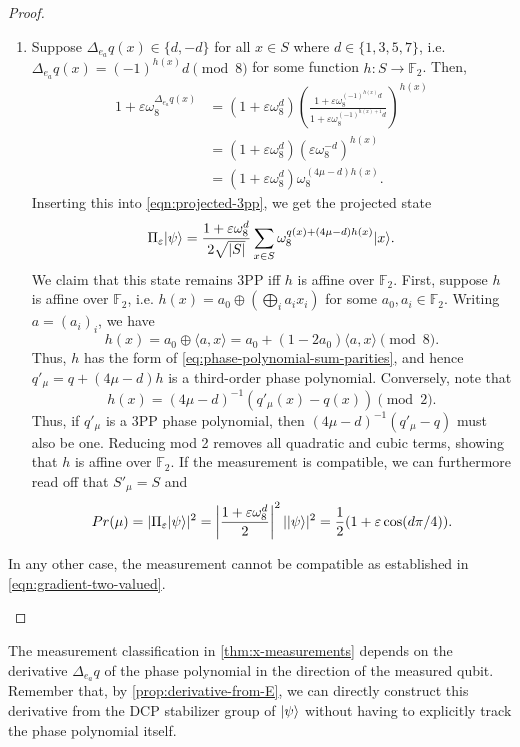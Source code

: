 \begin{proof}
\begin{enumerate}
\begin{enumerate}
\item
Suppose $\Delta_{e_a}q(x) \in \{ d, -d \}$ for all $x \in S$ where $d \in \{ 1, 3, 5, 7 \}$, i.e. $\Delta_{e_a}q(x) = (-1)^{h(x)}d \pmod 8$ for some function $h: S \to \mathbb F_2$.
Then,
\begin{align*}
    1 + \varepsilon\omega_8^{\Delta_{e_a}q(x)}
    &= (1 + \varepsilon\omega_8^d) \left(\frac{1 + \varepsilon\omega_8^{(-1)^{h(x)} d}}{1 + \varepsilon\omega_8^{(-1)^{h(x) + 1} d}}\right)^{h(x)} \\
    &= (1 + \varepsilon\omega_8^d) (\varepsilon\omega_8^{-d})^{h(x)} \\
    &= (1 + \varepsilon\omega_8^d) \omega_8^{(4\mu - d)h(x)}.
\end{align*}
Inserting this into \cref{eqn:projected-3pp}, we get the projected state
\[ \Pi_\varepsilon |\psi\rangle = \frac{1 + \varepsilon\omega_8^d}{2\sqrt{|S|}} \sum_{x \in S} \omega_8^{q(x) + (4\mu - d)h(x)} |x\rangle. \]
We claim that this state remains 3PP iff $h$ is affine over $\mathbb F_2$.
First, suppose $h$ is affine over $\mathbb F_2$, i.e. $h(x) = a_0 \oplus \left(\bigoplus_i a_i x_i\right)$ for some $a_0,a_i \in \mathbb F_2$. Writing $a=(a_i)_i$, we have
\[
    h(x) = a_0 \oplus \langle a,x\rangle
    = a_0 + (1-2a_0)\langle a,x\rangle \pmod 8.
\]
Thus, $h$ has the form of \cref{eq:phase-polynomial-sum-parities}, and hence $q'_\mu=q+(4\mu-d)h$ is a third-order phase polynomial.
Conversely, note that
\[ h(x) = (4\mu - d)^{-1}(q'_\mu(x) - q(x)) \pmod 2. \]
Thus, if $q'_\mu$ is a 3PP phase polynomial, then $(4\mu - d)^{-1}(q'_\mu - q)$ must also be one.
Reducing mod 2 removes all quadratic and cubic terms, showing that $h$ is affine over $\mathbb F_2$.
If the measurement is compatible, we can furthermore read off that $S'_\mu = S$ and
\[ Pr(\mu) = |\Pi_\varepsilon|\psi\rangle|^2 = \left|\frac{1 + \varepsilon\omega_8^d}{2}\right|^2 ||\psi\rangle|^2 = \frac{1}{2}(1 + \varepsilon\cos(d\pi/4)). \]

\end{enumerate}

In any other case, the measurement cannot be compatible as established in \cref{eqn:gradient-two-valued}. \qedhere

\end{enumerate}
\end{proof}

The measurement classification in \cref{thm:x-measurements} depends on the derivative $\Delta_{e_a}q$ of the phase polynomial in the direction of the measured qubit.
Remember that, by \cref{prop:derivative-from-E},  we can directly construct this derivative from the DCP stabilizer group of $|\psi\rangle$ without having to explicitly track the phase polynomial itself.

